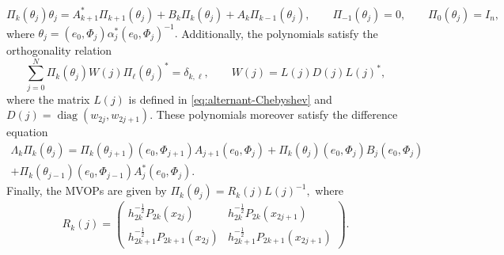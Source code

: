 \documentclass[a4paper,reqno]{amsart}
\DeclareMathOperator{\diag}{diag}
\theoremstyle{definition}
\numberwithin{equation}{section}
\begin{document}
 \begin{equation}
\Pi_k(\theta_j)\theta_j=A_{k+1}^*\Pi_{k+1}(\theta_j)+B_k\Pi_k(\theta_j)+A_k\Pi_{k-1}(\theta_j), \qquad 
\Pi_{-1}(\theta_j)=0,\qquad \Pi_0(\theta_j)=I_n,
\end{equation}
 where $\theta_j=( e_0, \Phi_j) \alpha_j^*( e_0, \Phi_j)^{-1}.$ Additionally, the polynomials satisfy the orthogonality relation
\begin{equation}
    \sum_{j=0}^N \Pi_{k}(\theta_j)W(j)\Pi_{\ell}(\theta_j)^\ast=\delta_{k,\ell},\qquad W(j)=L(j)D(j)L(j)^\ast,
\end{equation} 
where the matrix $L(j)$ is defined in \eqref{eq:alternant-Chebyshev} and $D(j)=\diag(w_{2j}, w_{2j+1}).$ These polynomials moreover satisfy the difference equation
\begin{multline}
   \Lambda_k\Pi_k(\theta_j)=\Pi_k(\theta_{j+1})(e_0,\Phi_{j+1})A_{j+1}(e_0,\Phi_j)+\Pi_k(\theta_{j})(e_0,\Phi_{j})B_{j}(e_0,\Phi_j)\\+\Pi_k(\theta_{j-1})(e_0,\Phi_{j-1})A_{j}^\ast(e_0,\Phi_j). 
\end{multline}
Finally, the MVOPs are given by $\Pi_k(\theta_j)=R_k(j)L(j)^{-1},$ where
\begin{equation}
    R_k(j)=\begin{pmatrix}
h_{2k}^{-\frac{1}{2}}P_{2k}(x_{2j})&h_{2k}^{-\frac{1}{2}}P_{2k}(x_{2j+1})\\
h_{2k+1}^{-\frac{1}{2}}P_{2k+1}(x_{2j})&h_{2k+1}^{-\frac{1}{2}}P_{2k+1}(x_{2j+1})
\end{pmatrix}.
\end{equation}
\end{document}
